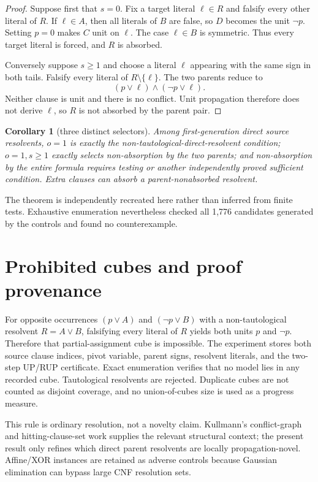 \documentclass[11pt]{article}
\newtheorem{corollary}{Corollary}
\begin{document}
\begin{proof}
Suppose first that $s=0$.  Fix a target literal $\ell\in R$ and falsify every other literal of $R$.  If $\ell\in A$, then all literals of $B$ are false, so $D$ becomes the unit $\neg p$.  Setting $p=0$ makes $C$ unit on $\ell$.  The case $\ell\in B$ is symmetric.  Thus every target literal is forced, and $R$ is absorbed.

Conversely suppose $s\geq1$ and choose a literal $\ell$ appearing with the same sign in both tails.  Falsify every literal of $R\setminus\{\ell\}$.  The two parents reduce to
\[
(p\vee\ell)\wedge(\neg p\vee\ell).
\]
Neither clause is unit and there is no conflict.  Unit propagation therefore does not derive $\ell$, so $R$ is not absorbed by the parent pair.
\end{proof}

\begin{corollary}[three distinct selectors]
Among first-generation direct source resolvents, $o=1$ is exactly the non-tautological-direct-resolvent condition; $o=1,s\geq1$ exactly selects non-absorption by the two parents; and non-absorption by the entire formula requires testing or another independently proved sufficient condition.  Extra clauses can absorb a parent-nonabsorbed resolvent.
\end{corollary}

The theorem is independently recreated here rather than inferred from finite tests.  Exhaustive enumeration nevertheless checked all 1,776 candidates generated by the controls and found no counterexample.

\section{Prohibited cubes and proof provenance}
For opposite occurrences $(p\vee A)$ and $(\neg p\vee B)$ with a non-tautological resolvent $R=A\vee B$, falsifying every literal of $R$ yields both units $p$ and $\neg p$.  Therefore that partial-assignment cube is impossible.  The experiment stores both source clause indices, pivot variable, parent signs, resolvent literals, and the two-step UP/RUP certificate.  Exact enumeration verifies that no model lies in any recorded cube.  Tautological resolvents are rejected.  Duplicate cubes are not counted as disjoint coverage, and no union-of-cubes size is used as a progress measure.

This rule is ordinary resolution, not a novelty claim.  Kullmann's conflict-graph and hitting-clause-set work supplies the relevant structural context; the present result only refines which direct parent resolvents are locally propagation-novel.  Affine/XOR instances are retained as adverse controls because Gaussian elimination can bypass large CNF resolution sets.
\end{document}
